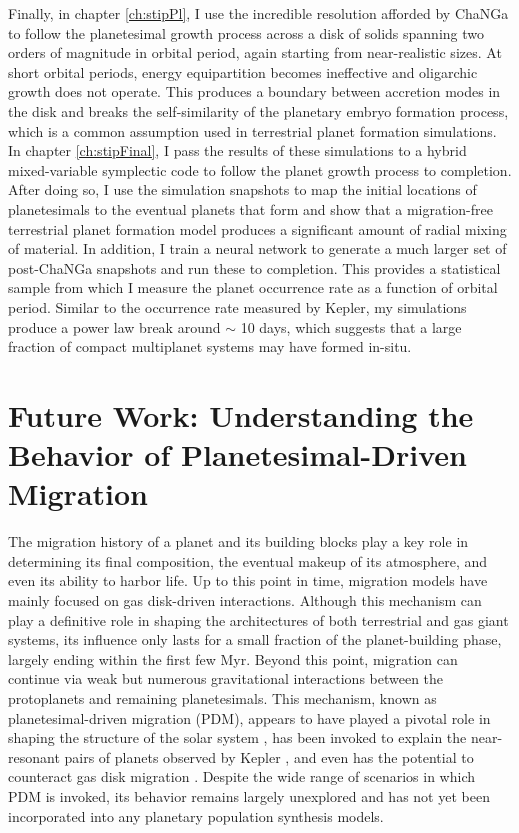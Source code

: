 Finally, in chapter \ref{ch:stipPl}, I use the incredible resolution afforded by {\sc ChaNGa} to follow the planetesimal growth process across a disk of solids spanning two orders of magnitude in orbital period, again starting from near-realistic sizes. At short orbital periods, energy equipartition becomes ineffective and oligarchic growth does not operate. This produces a boundary between accretion modes in the disk and breaks the self-similarity of the planetary embryo formation process, which is a common assumption used in terrestrial planet formation simulations. In chapter \ref{ch:stipFinal}, I pass the results of these simulations to a hybrid mixed-variable symplectic code to follow the planet growth process to completion. After doing so, I use the simulation snapshots to map the initial locations of planetesimals to the eventual planets that form and show that a migration-free terrestrial planet formation model produces a significant amount of radial mixing of material. In addition, I train a neural network to generate a much larger set of post-{\sc ChaNGa} snapshots and run these to completion. This provides a statistical sample from which I measure the planet occurrence rate as a function of orbital period. Similar to the occurrence rate measured by Kepler, my simulations produce a power law break around $\sim$ 10 days, which suggests that a large fraction of compact multiplanet systems may have formed in-situ.

\section{Future Work: Understanding the Behavior of Planetesimal-Driven Migration}

The migration history of a planet and its building blocks play a key role in determining its final composition, the eventual makeup of its atmosphere, and even its ability to harbor life. Up to this point in time, migration models have mainly focused on gas disk-driven interactions. Although this mechanism can play a definitive role in shaping the architectures of both terrestrial and gas giant systems, its influence only lasts for a small fraction of the planet-building phase, largely ending within the first few Myr. Beyond this point, migration can continue via weak but numerous gravitational interactions between the protoplanets and remaining planetesimals. This mechanism, known as planetesimal-driven migration (PDM), appears to have played a pivotal role in shaping the structure of the solar system \cite{tsiganis05, levison11, nesvorny11}, has been invoked to explain the near-resonant pairs of planets observed by Kepler \cite{chatterjee15}, and even has the potential to counteract gas disk migration \cite{minton14}. Despite the wide range of scenarios in which PDM is invoked, its behavior remains largely unexplored and has not yet been incorporated into any planetary population synthesis models. 

